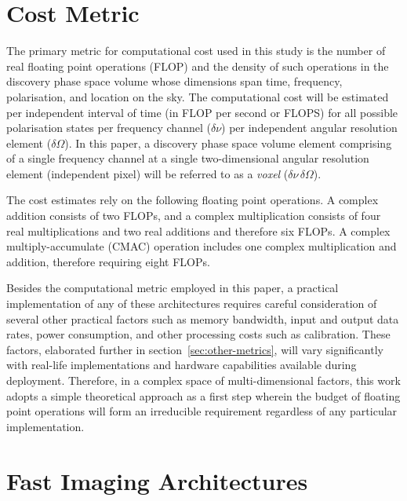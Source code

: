 \documentclass[
  journal=pasa,
  manuscript=article-type,
  year=2020,
  volume=37,
]{cup-journal}
\begin{document}
\section{Cost Metric} \label{sec:computational-cost}

The primary metric for computational cost used in this study is the number of real floating point operations (FLOP) and the density of such operations in the discovery phase space volume whose dimensions span time, frequency, polarisation, and location on the sky. The computational cost will be estimated per independent interval of time (in FLOP per second or FLOPS) for all possible polarisation states per frequency channel ($\delta\nu$) per independent angular resolution element ($\delta\Omega$). In this paper, a discovery phase space volume element comprising of a single frequency channel at a single two-dimensional angular resolution element (independent pixel) will be referred to as a \textit{voxel} ($\delta\nu\,\delta\Omega$).

The cost estimates rely on the following floating point operations. A complex addition consists of two FLOPs, and a complex multiplication consists of four real multiplications and two real additions and therefore six FLOPs. A complex multiply-accumulate (CMAC) operation includes one complex multiplication and addition, therefore requiring eight FLOPs.

Besides the computational metric employed in this paper, a practical implementation of any of these architectures requires careful consideration of several other practical factors such as memory bandwidth, input and output data rates, power consumption, and other processing costs such as calibration. These factors, elaborated further in section~\ref{sec:other-metrics}, will vary significantly with real-life implementations and hardware capabilities available during deployment. Therefore, in a complex space of multi-dimensional factors, this work adopts a simple theoretical approach as a first step wherein the budget of floating point operations will form an irreducible requirement regardless of any particular implementation. 

\section{Fast Imaging Architectures} \label{sec:img-archs}
\end{document}
